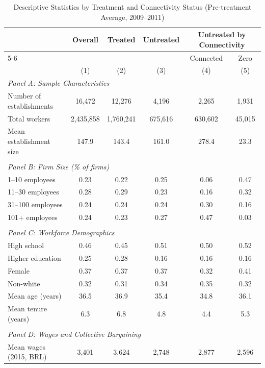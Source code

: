 \begin{table}[H]
\centering
\caption{Descriptive Statistics by Treatment and Connectivity Status (Pre-treatment Average, 2009--2011)}
\label{tab:descriptive_stats_pretreat}
\scriptsize
\begin{threeparttable}
\begin{tabular}{lccccc}
\toprule\toprule
 & \multicolumn{1}{c}{Overall} & \multicolumn{1}{c}{Treated} & \multicolumn{1}{c}{Untreated} & \multicolumn{2}{c}{Untreated by Connectivity} \\
 \cmidrule(lr){5-6}
 & & & & Connected & Zero \\
 & (1) & (2) & (3) & (4) & (5) \\
\midrule
\multicolumn{6}{l}{\textit{Panel A: Sample Characteristics}} \\[0.5ex]
Number of establishments & 16,472 & 12,276 & 4,196 & 2,265 & 1,931 \\
Total workers & 2,435,858 & 1,760,241 & 675,616 & 630,602 & 45,015 \\
Mean establishment size & 147.9 & 143.4 & 161.0 & 278.4 & 23.3 \\
&&&&& \\
\multicolumn{6}{l}{\textit{Panel B: Firm Size (\% of firms)}} \\[0.5ex]
1--10 employees & 0.23 & 0.22 & 0.25 & 0.06 & 0.47 \\
11--30 employees & 0.28 & 0.29 & 0.23 & 0.16 & 0.32 \\
31--100 employees & 0.24 & 0.24 & 0.24 & 0.30 & 0.16 \\
101+ employees & 0.24 & 0.23 & 0.27 & 0.47 & 0.03 \\
&&&&& \\
\multicolumn{6}{l}{\textit{Panel C: Workforce Demographics}} \\[0.5ex]
High school & 0.46 & 0.45 & 0.51 & 0.50 & 0.52 \\
Higher education & 0.25 & 0.28 & 0.16 & 0.16 & 0.16 \\
Female & 0.37 & 0.37 & 0.37 & 0.32 & 0.41 \\
Non-white & 0.32 & 0.31 & 0.34 & 0.35 & 0.32 \\
Mean age (years) & 36.5 & 36.9 & 35.4 & 34.8 & 36.1 \\
Mean tenure (years) & 6.3 & 6.8 & 4.8 & 4.4 & 5.3 \\
&&&&& \\
\multicolumn{6}{l}{\textit{Panel D: Wages and Collective Bargaining}} \\[0.5ex]
Mean wages (2015, BRL) & 3,401 & 3,624 & 2,748 & 2,877 & 2,596 \\

\end{tabular}
\end{threeparttable}
\end{table}
